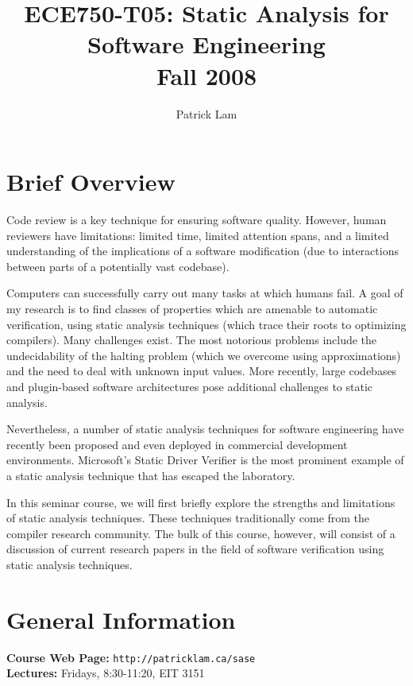 \documentclass{article}
\begin{document}
\title{ECE750-T05: Static Analysis for Software Engineering\\Fall 2008}
\author{Patrick Lam}
\renewcommand{\today}{September 12, 2008}
\maketitle

\section*{Brief Overview}

Code review is a key technique for ensuring software quality. However,
human reviewers have limitations: limited time, limited attention
spans, and a limited understanding of the implications of a software
modification (due to interactions between parts of a potentially vast
codebase).

Computers can successfully carry out many tasks at which humans fail.
A goal of my research is to find classes of properties which are
amenable to automatic verification, using static analysis
techniques (which trace their roots to optimizing compilers). 
Many challenges exist. The most notorious
problems include the undecidability of the halting problem (which we
overcome using approximations) and the need to deal with unknown input
values. More recently, large codebases and plugin-based software
architectures pose additional challenges to static analysis.

Nevertheless, a number of static analysis techniques for software
engineering have recently been proposed and even deployed in commercial
development environments. Microsoft's Static Driver Verifier is the 
most prominent example of a static analysis technique that has escaped the
laboratory.

In this seminar course, we will first briefly explore the strengths and
limitations of static analysis techniques. These techniques
traditionally come from the compiler research community. The bulk of
this course, however, will consist of a discussion of current research papers
in the field of software verification using static analysis techniques.

\section*{General Information}

\noindent
{\bf Course Web Page:} {\tt http://patricklam.ca/sase}\\
{\bf Lectures:} Fridays, 8:30-11:20, EIT 3151\\
\end{document}
